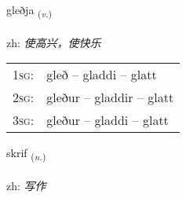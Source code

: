 \documentclass[frontgrid, backgrid]{flacards}\usepackage[]{graphicx}\usepackage[]{color}
\begin{document}
\renewcommand{\blhead}{\vskip5pt {\small\bfseries\footnotesize Sagnorð | 动词 }}
\renewcommand{\bcfoot}{\vskip5pt \hspace{2pt}{\small\bfseries\footnotesize 2K}}


{gleðja \small{\textsubscript{(\textit{v.})}} \\[1ex] %
\textphonetic{[klɛðja]} \\
zh: \emph{使高兴，使快乐} \\  [2ex]
\renewcommand*{\arraystretch}{0.8}
\begin{tabular}{p{1cm}l}
\textsc{1sg}: & gleð -- gladdi -- glatt \\ 
\textsc{2sg}: & gleður -- gladdir -- glatt \\ 
\textsc{3sg}: & gleður -- gladdi -- glatt \\ 
\end{tabular}
}

\renewcommand{\flhead}{\vskip5pt \fboxsep=0pt {\small\bfseries\footnotesize Nafnorð | 名词}}
\renewcommand{\fcfoot}{\vskip5pt \fboxsep=0pt \hspace{2pt}{\small\bfseries\footnotesize 2K}}

\renewcommand{\blhead}{\vskip5pt {\small\bfseries\footnotesize Nafnorð | 名词 }}
\renewcommand{\bcfoot}{\vskip5pt \hspace{2pt}{\small\bfseries\footnotesize 2K}}


{skrif \small{\textsubscript{(\textit{n.})}} \\[1ex] %
\textphonetic{[skrɪːv]} \\
zh: \emph{写作} \\  [2ex]
\renewcommand*{\arraystretch}{0.8}
}

\renewcommand{\flhead}{\vskip5pt \fboxsep=0pt {\small\bfseries\footnotesize Sagnorð | 动词}}
\renewcommand{\fcfoot}{\vskip5pt \fboxsep=0pt \hspace{2pt}{\small\bfseries\footnotesize 2K}}
\end{document}
